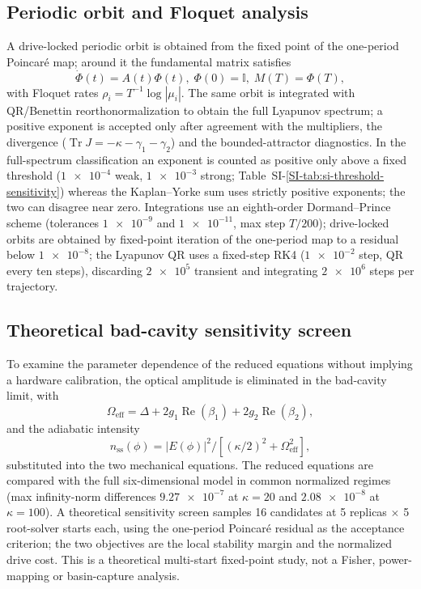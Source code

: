 \documentclass[Phys]{SciPost}
\newcommand{\Tr}{\operatorname{Tr}}
\begin{document}
\subsection{Periodic orbit and Floquet analysis}

A drive-locked periodic orbit is obtained from the fixed point of the one-period Poincar\'e map; around it the fundamental matrix satisfies
\begin{equation}\label{eq:monodromy}
\dot{\Phi}(t)=A(t)\Phi(t),\;\Phi(0)=\mathbb{I},\;M(T)=\Phi(T),
\end{equation}
with Floquet rates $\rho_i=T^{-1}\log|\mu_i|$. The same orbit is integrated with QR/Benettin reorthonormalization \cite{benettin1980,wolf1985,eckmann1985} to obtain the full Lyapunov spectrum; a positive exponent is accepted only after agreement with the multipliers, the divergence ($\Tr J=-\kappa-\gamma_1-\gamma_2$) and the bounded-attractor diagnostics. In the full-spectrum classification an exponent is counted as positive only above a fixed threshold ($\num{1e-4}$ weak, $\num{1e-3}$ strong; Table~SI-\ref{SI-tab:si-threshold-sensitivity}) whereas the Kaplan--Yorke sum uses strictly positive exponents; the two can disagree near zero. Integrations use an eighth-order Dormand--Prince scheme \cite{dormand1980} (tolerances $\num{1e-9}$ and $\num{1e-11}$, max step $T/200$); drive-locked orbits are obtained by fixed-point iteration of the one-period map to a residual below $\num{1e-8}$; the Lyapunov QR uses a fixed-step RK4 ($\num{1e-2}$ step, QR every ten steps), discarding $\num{2e5}$ transient and integrating $\num{2e6}$ steps per trajectory.

\subsection{Theoretical bad-cavity sensitivity screen}

To examine the parameter dependence of the reduced equations without implying a hardware calibration, the optical amplitude is eliminated in the bad-cavity limit, with
\begin{equation}
 \Omega_{\mathrm{eff}}=\Delta+2g_1\operatorname{Re}(\beta_1)+2g_2\operatorname{Re}(\beta_2),
\end{equation}
and the adiabatic intensity
\begin{equation}\label{eq:adiabatic-intensity}
 n_{\mathrm{ss}}(\phi)=|E(\phi)|^2/[(\kappa/2)^2+\Omega_{\mathrm{eff}}^2],
\end{equation}
substituted into the two mechanical equations. The reduced equations are compared with the full six-dimensional model in common normalized regimes (max infinity-norm differences $\num{9.27e-7}$ at $\kappa=20$ and $\num{2.08e-8}$ at $\kappa=100$). A theoretical sensitivity screen samples 16 candidates at 5 replicas $\times$ 5 root-solver starts each, using the one-period Poincar\'e residual as the acceptance criterion; the two objectives are the local stability margin and the normalized drive cost. This is a theoretical multi-start fixed-point study, not a Fisher, power-mapping or basin-capture analysis.
\end{document}
